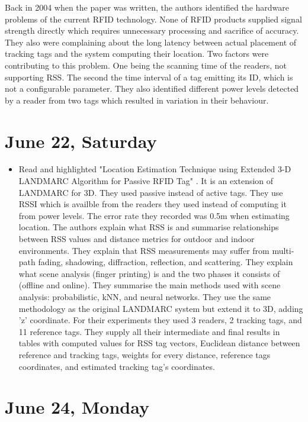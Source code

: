 \documentclass[a4paper,12pt]{article}
\begin{document}
\begin{itemize}
	Back in 2004 when the paper was written, the authors identified the hardware problems of the current RFID technology. None of RFID products supplied signal strength directly which requires unnecessary processing and sacrifice of accuracy. They also were complaining about the long latency between actual placement of tracking tags and the system computing their location. Two factors were contributing to this problem. One being the scanning time of the readers, not supporting RSS. The second the time interval of a tag emitting its ID, which is not a configurable parameter. They also identified different power levels detected by a reader from two tags which resulted in variation in their behaviour. 
\end{itemize}

\section{June 22, Saturday}

\begin{itemize}
	\item Read and highlighted "Location Estimation Technique using Extended 3-D LANDMARC Algorithm for Passive RFID Tag" \cite{Khan2009}. It is an extension of LANDMARC for 3D. They used passive instead of active tags. They use RSSI which is availble from the readers they used instead of computing it from power levels. The error rate they recorded was 0.5m when estimating location. The authors explain what RSS is and summarise relationships between RSS values and distance metrics for outdoor and indoor environments. They explain that RSS measurements may suffer from multi-path fading, shadowing, diffraction, reflection, and scattering. They explain what scene analysis (finger printing) is and the two phases it consists of (offline and online). They summarise the main methods used with scene analysis: probabilistic, kNN, and neural networks. They use the same methodology as the original LANDMARC system but extend it to 3D, adding 'z' coordinate. For their experiments they used 3 readers, 2 tracking tags, and 11 reference tags. They supply all their intermediate and final results in tables with computed values for RSS tag vectors, Euclidean distance between reference and tracking tags, weights for every distance, reference tags coordinates, and estimated tracking tag's coordinates.
\end{itemize}

\section{June 24, Monday}
\end{document}
